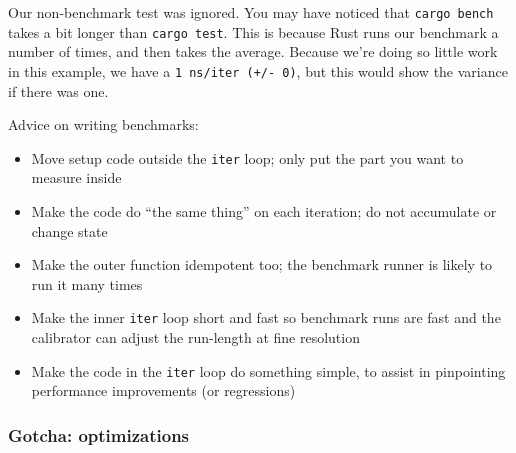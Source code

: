 \documentclass[a4paper,]{book}
\newenvironment{Shaded}{\begin{snugshade}}{\end{snugshade}}
\newcommand{\KeywordTok}[1]{\textcolor[rgb]{0.13,0.29,0.53}{\textbf{{#1}}}}
\newcommand{\NormalTok}[1]{{#1}}
\begin{document}
\begin{Shaded}
\end{Shaded}

Our non-benchmark test was ignored. You may have noticed that
\texttt{cargo\ bench} takes a bit longer than \texttt{cargo\ test}. This
is because Rust runs our benchmark a number of times, and then takes the
average. Because we're doing so little work in this example, we have a
\texttt{1\ ns/iter\ (+/-\ 0)}, but this would show the variance if there
was one.

Advice on writing benchmarks:

\begin{itemize}
\itemsep1pt\parskip0pt
\item
  Move setup code outside the \texttt{iter} loop; only put the part you
  want to measure inside
\item
  Make the code do ``the same thing'' on each iteration; do not
  accumulate or change state
\item
  Make the outer function idempotent too; the benchmark runner is likely
  to run it many times
\item
  Make the inner \texttt{iter} loop short and fast so benchmark runs are
  fast and the calibrator can adjust the run-length at fine resolution
\item
  Make the code in the \texttt{iter} loop do something simple, to assist
  in pinpointing performance improvements (or regressions)
\end{itemize}

\subsubsection{Gotcha: optimizations}\label{gotcha-optimizations}
\end{document}
